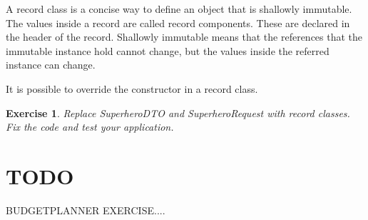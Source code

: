 \documentclass[a4paper, 12pt]{report}
\newenvironment{boxexercise}
{\begin{tcolorbox}
[enhanced jigsaw,breakable,pad at break*=1mm,
 colback=tsyellow!20,boxrule=0pt,frame hidden]}
{\end{tcolorbox}}
\newtheorem{envoefening}{\textbf{Exercise}}[chapter]
\newenvironment{oefening}
               {\begin{boxexercise}\begin{envoefening}}
               {\end{envoefening}\end{boxexercise}}
\begin{document}
A record class is a concise way to define an object that is shallowly immutable. The values inside a record are called record components. These are declared in the header of the record. Shallowly immutable means that the references that the immutable instance hold cannot change, but the values inside the referred instance can change.

It is possible to override the constructor in a record class.

\begin{oefening}
Replace SuperheroDTO and SuperheroRequest with record classes. Fix the code and test your application.
\end{oefening}
  

















\chapter{TODO}

BUDGETPLANNER EXERCISE....
\end{document}
